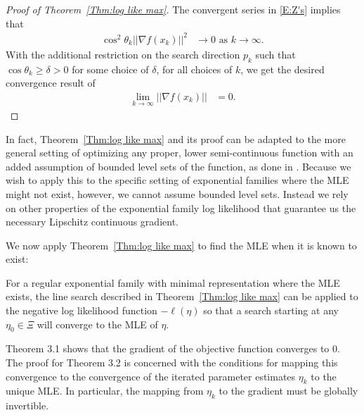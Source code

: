 \begin{proof}[Proof of Theorem~\ref{Thm:log like max}]
The convergent series in \eqref{E:Z's} implies that 
\begin{align*}
	\cos^2 \theta_k || \nabla f(x_k) ||^2 &\to 0 \text{ as } k \to \infty.
\end{align*}
With the additional restriction on the search direction $p_k$ such that $\cos \theta_k 
\geq \delta > 0$ for some choice 
of $\delta$, for all choices of $k$, we get the desired convergence result of
\begin{align*}
	\lim_{k \to \infty} || \nabla f(x_k) || &= 0.
\end{align*}

\end{proof}




In fact, Theorem~\ref{Thm:log like max} and its proof can be adapted to the more
general setting
of optimizing any proper, lower semi-continuous function with an added assumption of 
bounded level sets of the function, as done in \citep{Okabayashi:longrange}.  Because 
we wish to apply this to the specific setting of exponential families where the MLE 
might not exist, however, we cannot
assume bounded level sets.  Instead we rely on other properties of the exponential
family log likelihood that guarantee us the necessary Lipschitz continuous gradient.  

We now apply Theorem~\ref{Thm:log like max} to find the MLE when it is known to exist:  

\begin{theorem}[] \label{Thm:Line Search works}
For a regular exponential family with minimal representation where the MLE exists, the 
line search described in 
Theorem~\ref{Thm:log like max} can be applied to the negative log likelihood function 
$-\ell(\eta)$ so that a search 
starting at any $\eta_0 \in \Xi$ will converge to the MLE of $\eta$.
\end{theorem}

Theorem 3.1 shows that the gradient of the objective function converges to 0.  The 
proof for Theorem 3.2 is concerned 
with the conditions for mapping this convergence to the convergence of the iterated 
parameter estimates $\eta_k$ to the 
unique MLE.  In particular, the mapping from $\eta_k$ to the gradient must be globally 
invertible.


